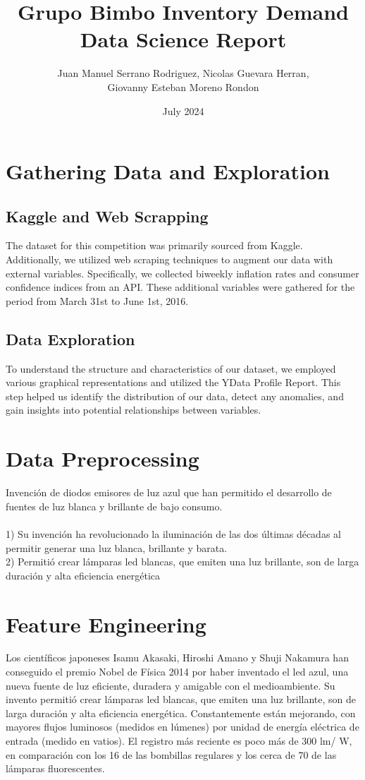 \documentclass{article}
\title{Grupo Bimbo Inventory Demand \\Data Science Report }
\author{Juan Manuel Serrano Rodriguez, Nicolas Guevara Herran,\\ Giovanny Esteban Moreno Rondon}
\date{July 2024}
\begin{document}
\maketitle

\section{Gathering Data and Exploration}
\subsection{Kaggle and Web Scrapping}
The dataset for this competition was primarily sourced from Kaggle. Additionally, we utilized web scraping techniques to augment our data with external variables. Specifically, we collected biweekly inflation rates and consumer confidence indices from an API. These additional variables were gathered for the period from March 31st to June 1st, 2016.
\subsection{Data Exploration}
To understand the structure and characteristics of our dataset, we employed various graphical representations and utilized the YData Profile Report. This step helped us identify the distribution of our data, detect any anomalies, and gain insights into potential relationships between variables.

\section{Data Preprocessing}
Invención de diodos emisores de luz azul que han permitido el desarrollo de fuentes de luz blanca y brillante de bajo consumo.\\\\
1) Su invención ha revolucionado la iluminación de las dos últimas décadas al permitir generar una luz blanca, brillante y barata.\\
2) Permitió crear lámparas led blancas, que emiten una luz brillante, son de larga duración y alta eficiencia energética

\section{Feature Engineering}
Los científicos japoneses Isamu Akasaki, Hiroshi Amano y Shuji Nakamura han conseguido el premio Nobel de Física 2014 por haber inventado el led azul, una nueva fuente de luz eficiente, duradera y amigable con el medioambiente. 
Su invento permitió crear lámparas led blancas, que emiten una luz brillante, son de larga duración y alta eficiencia energética. Constantemente están mejorando, con mayores flujos luminosos (medidos en lúmenes) por unidad de energía eléctrica de entrada (medido en vatios). El registro más reciente es poco más de 300 lm/ W, en comparación con los 16 de las bombillas regulares y los cerca de 70 de las lámparas fluorescentes.
\end{document}
